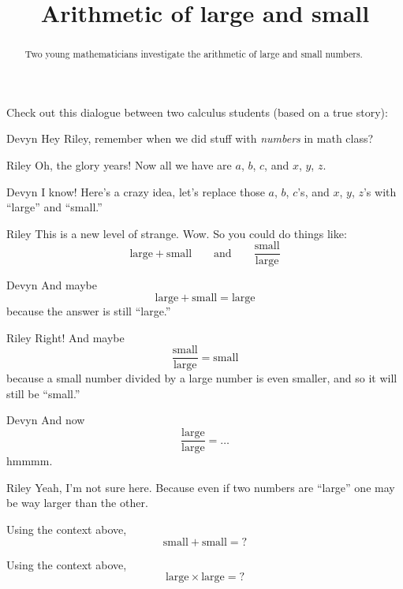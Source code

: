\documentclass{ximera}
\title[Break-Ground:]{Arithmetic of large and small}
\begin{document}
\begin{abstract}
Two young mathematicians investigate the arithmetic of large
and small numbers.
\end{abstract}
\maketitle


Check out this dialogue between two calculus students (based on a true
story):

\begin{dialogue}
\item[Devyn] Hey Riley, remember when we did stuff with
  \textit{numbers} in math class?
\item[Riley] Oh, the glory years! Now all we have are $a$, $b$, $c$, and $x$, $y$, $z$.
\item[Devyn] I know! Here's a crazy idea, let's replace those $a$,
  $b$, $c$'s, and $x$, $y$, $z$'s with ``large'' and ``small.''
\item[Riley] This is a new level of strange. Wow. So you could do things like:
  \[
  \text{large}+\text{small}\qquad\text{and}\qquad \frac{\text{small}}{\text{large}}
  \]
\item[Devyn] And maybe
  \[
  \text{large}+\text{small} = \text{large}
  \]
  because the answer is still ``large.''
\item[Riley] Right! And maybe
  \[
  \frac{\text{small}}{\text{large}} = \text{small}
  \]
  because a small number divided by a large number is even smaller, and so it will still be ``small.''
\item[Devyn] And now
  \[
  \frac{\text{large}}{\text{large}} = \dots
  \]
  hmmmm.
  \item[Riley] Yeah, I'm not sure here. Because even if two numbers are
    ``large'' one may be way larger than the other.
\end{dialogue}



\begin{problem}
  Using the context above, 
  \[
  \text{small}+\text{small} = ?
  \]
  \begin{multipleChoice}
  \end{multipleChoice}
\end{problem}


\begin{problem}
  Using the context above, 
  \[
  \text{large}\times\text{large} = ?
  \]
  \begin{multipleChoice}
  \end{multipleChoice}
\end{problem}
\end{document}
